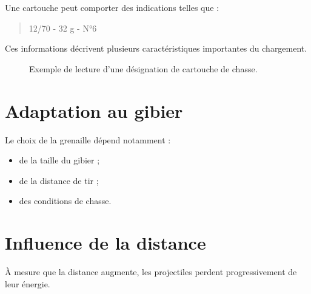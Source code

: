 Une cartouche peut comporter des indications telles que :

\begin{quote}
12/70 - 32 g - N°6
\end{quote}

Ces informations décrivent plusieurs caractéristiques importantes du
chargement.

\begin{figure}[htbp]
\centering


\caption{Exemple de lecture d'une désignation de cartouche de chasse.}
\label{fig:designation_cartouche_chasse}

\end{figure}

\section{Adaptation au gibier}

Le choix de la grenaille dépend notamment :

\begin{itemize}
    \item de la taille du gibier ;
    \item de la distance de tir ;
    \item des conditions de chasse.
\end{itemize}

\section{Influence de la distance}

À mesure que la distance augmente, les projectiles perdent progressivement
de leur énergie.

